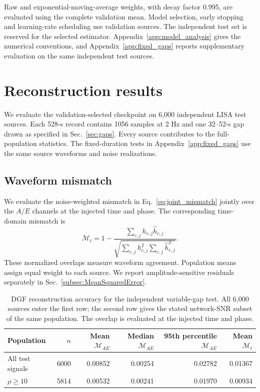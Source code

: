 \documentclass[10pt,prd,aps,a4paper,twocolumn,superscriptaddress,nofootinbib,floatfix]{revtex4-2}
\begin{document}
Raw and exponential-moving-average weights, with decay factor 0.995, are evaluated using the complete validation mean. Model selection, early stopping and learning-rate scheduling use validation sources. The independent test set is reserved for the selected estimator. Appendix~\ref{app:model_analysis} gives the numerical conventions, and Appendix~\ref{app:fixed_gaps} reports supplementary evaluation on the same independent test sources.

\section{Reconstruction results}\label{sec:results}
We evaluate the validation-selected checkpoint on 6,000 independent LISA test sources. Each 528-s record contains 1056 samples at 2 Hz and one 32--52-s gap drawn as specified in Sec.~\ref{sec:gaps}. Every source contributes to the full-population statistics. The fixed-duration tests in Appendix~\ref{app:fixed_gaps} use the same source waveforms and noise realizations.

\subsection{Waveform mismatch}\label{subsec:Mismatch}
We evaluate the noise-weighted mismatch in Eq.~\eqref{eq:joint_mismatch} jointly over the $A/E$ channels at the injected time and phase. The corresponding time-domain mismatch is
\begin{equation}
\mathcal M_t=1-\frac{\sum_{c,j}h_{c,j}\widehat h_{c,j}}{\sqrt{\sum_{c,j}h_{c,j}^2\sum_{c,j}\widehat h_{c,j}^2}}.
\end{equation}
These normalized overlaps measure waveform agreement. Population means assign equal weight to each source. We report amplitude-sensitive residuals separately in Sec.~\ref{subsec:MeanSquaredError}.

\begin{table}[t]\centering
\caption{DGF reconstruction accuracy for the independent variable-gap test. All 6,000 sources enter the first row; the second row gives the stated network-SNR subset of the same population. The overlap is evaluated at the injected time and phase.}\label{tab:results}
\begin{tabular}{lrrrrr}\hline\hline
Population & $n$ & Mean $\mathcal M_{AE}$ & Median $\mathcal M_{AE}$ & 95th percentile $\mathcal M_{AE}$ & Mean $\mathcal M_t$\\\hline
All test signals & 6000 & 0.00852 & 0.00254 & 0.02782 & 0.01367 \\
$\rho\ge10$ & 5814 & 0.00532 & 0.00241 & 0.01970 & 0.00934 \\
\hline\hline\end{tabular}\end{table}
\end{document}
